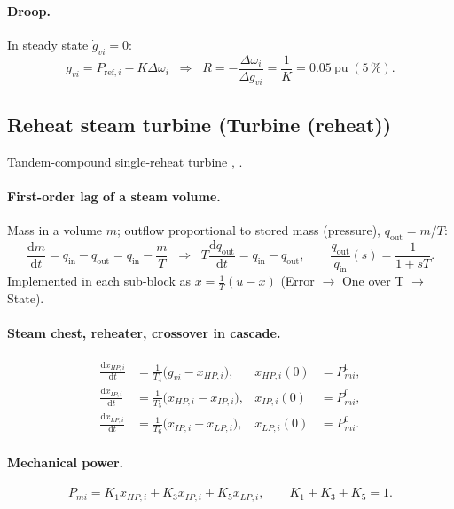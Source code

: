 \documentclass[11pt,a4paper]{article}
\numberwithin{equation}{section}
\newcommand{\dd}{\mathrm{d}}
\newcommand{\blk}[1]{\textsf{#1}}
\begin{document}
\paragraph{Droop.} In steady state $\dot g_{vi}=0$:
\begin{equation}
g_{vi} = P_{\text{ref},i} - K\Delta\omega_i
\;\;\Longrightarrow\;\;
R = -\frac{\Delta\omega_i}{\Delta g_{vi}} = \frac{1}{K} = 0.05~\text{pu}\;(5\,\%).
\end{equation}

\subsection{Reheat steam turbine (\blk{Turbine (reheat)})}
Tandem-compound single-reheat turbine \cite{IEEE1973,PESTR1}, \cite[Ch.~9]{Kundur1994}.
\paragraph{First-order lag of a steam volume.}
Mass in a volume $m$; outflow proportional to stored mass (pressure), $q_{\text{out}} = m/T$:
\begin{equation}
\frac{\dd m}{\dd t} = q_{\text{in}} - q_{\text{out}} = q_{\text{in}} - \frac{m}{T}
\;\;\Longrightarrow\;\;
T\frac{\dd q_{\text{out}}}{\dd t} = q_{\text{in}} - q_{\text{out}},
\qquad
\frac{q_{\text{out}}}{q_{\text{in}}}(s) = \frac{1}{1+sT}.
\end{equation}
Implemented in each sub-block as $\dot x = \frac{1}{T}(u - x)$ (\blk{Error} $\to$ \blk{One over T} $\to$ \blk{State}).

\paragraph{Steam chest, reheater, crossover in cascade.}
\begin{align}
\frac{\dd x_{HP,i}}{\dd t} &= \frac{1}{T_4}\big(g_{vi} - x_{HP,i}\big), & x_{HP,i}(0)&=P_{mi}^0,\\
\frac{\dd x_{IP,i}}{\dd t} &= \frac{1}{T_5}\big(x_{HP,i} - x_{IP,i}\big), & x_{IP,i}(0)&=P_{mi}^0,\\
\frac{\dd x_{LP,i}}{\dd t} &= \frac{1}{T_6}\big(x_{IP,i} - x_{LP,i}\big), & x_{LP,i}(0)&=P_{mi}^0.
\end{align}
\paragraph{Mechanical power.}
\begin{equation}
\boxed{P_{mi} = K_1 x_{HP,i} + K_3 x_{IP,i} + K_5 x_{LP,i},\qquad K_1+K_3+K_5 = 1.}
\end{equation}
\end{document}
